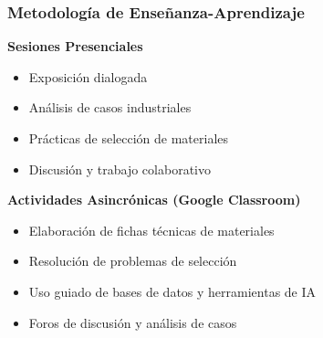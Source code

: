 \documentclass{beamer}
\begin{document}
\begin{frame}
    \frametitle{Metodología de Enseñanza-Aprendizaje}
    
    \textbf{Sesiones Presenciales}
    \begin{itemize}
        \item Exposición dialogada
        \item Análisis de casos industriales
        \item Prácticas de selección de materiales
        \item Discusión y trabajo colaborativo
    \end{itemize}
    \vspace{0.3cm}
    
    \textbf{Actividades Asincrónicas (Google Classroom)}
    \begin{itemize}
        \item Elaboración de fichas técnicas de materiales
        \item Resolución de problemas de selección
        \item Uso guiado de bases de datos y herramientas de IA
        \item Foros de discusión y análisis de casos
    \end{itemize}
\end{frame}
\end{document}
